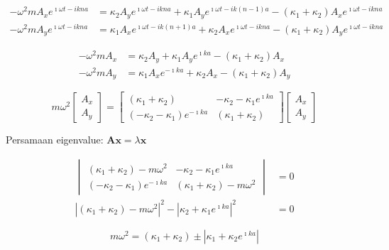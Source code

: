 \begin{align}
-\omega^2 m A_{x} e^{\imath \omega t - ikna} & =
\kappa_{2} A_{y} e^{\imath \omega t - ikna} +
\kappa_{1} A_{y} e^{\imath \omega t - ik(n-1)a} -
(\kappa_{1} + \kappa_{2}) A_{x} e^{\imath \omega t - ikna} \\
-\omega^2 m A_{y} e^{\imath \omega t - ikna} & =
\kappa_{1} A_{x} e^{\imath \omega t - ik(n+1)a} +
\kappa_{2} A_{x} e^{\imath \omega t - ikna} -
(\kappa_{1} + \kappa_{2}) A_{y} e^{\imath \omega t - ikna}
\end{align}


\begin{align}
-\omega^2 m A_{x} & = \kappa_{2} A_{y} + \kappa_{1} A_{y} e^{\imath ka} -
(\kappa_{1} + \kappa_{2})A_{x} \\
-\omega^2 m A_{y} & = \kappa_{1} A_{x} e^{-\imath k a} + \kappa_{2} A_{x} -
(\kappa_{1} + \kappa_{2})A_{y}
\end{align}

\begin{equation*}
m\omega^2 \begin{bmatrix}
A_{x} \\
A_{y}
\end{bmatrix} = 
\begin{bmatrix}
(\kappa_{1} + \kappa_{2}) & -\kappa_{2} - \kappa_{1} e^{\imath k a} \\
(-\kappa_{2} - \kappa_{1})e^{-\imath k a} & (\kappa_{1} + \kappa_{2})
\end{bmatrix}
\begin{bmatrix}
A_{x} \\
A_{y}
\end{bmatrix}    
\end{equation*}


Persamaan eigenvalue: \(\mathbf{A} \mathbf{x} = \lambda \mathbf{x}\)

\begin{align}
\begin{vmatrix}
(\kappa_{1} + \kappa_{2}) - m\omega^2 & -\kappa_{2} - \kappa_{1} e^{\imath k a} \\
(-\kappa_{2} - \kappa_{1})e^{-\imath k a} & (\kappa_{1} + \kappa_{2}) - m\omega^2
\end{vmatrix} & = 0 \\
\left| (\kappa_{1} + \kappa_{2}) - m\omega^2 \right|^2 -
\left| \kappa_{2} + \kappa_{1}e^{\imath k a} \right|^2 & = 0
\end{align}

\begin{equation*}
m\omega^2 = (\kappa_{1} + \kappa_{2}) \pm 
\left| \kappa_{1} + \kappa_{2} e^{\imath k a}\right|    
\end{equation*}

